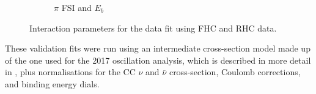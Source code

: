 \begin{figure}[t]
\begin{subfigure}{0.49\textwidth}
  \caption{$\pi$ FSI and $E_b$}
\end{subfigure}
\caption{Interaction parameters for the data fit using FHC and RHC data.}
\label{fig:rhcmpidat28xsec}
\end{figure}

These validation fits were run using an intermediate cross-section model made up of the one used for the 2017 oscillation analysis, which is described in more detail in \cite{tn315}, plus normalisations for the CC $\nu$ and $\bar{\nu}$ cross-section, Coulomb corrections, and binding energy dials. 

\newpage

